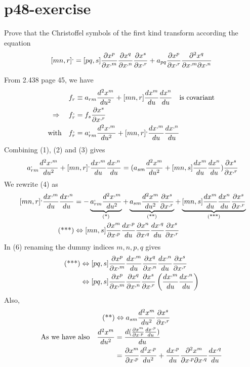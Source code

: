\section{p48-exercise }
\begin{tcolorbox}
Prove that the Christoffel symbols of the first kind transform according the equation 
$$[mn,r]^, =  [pq,s]\pdv{x^p}{x^{,m}} \pdv{x^q}{x^{,n}}\pdv{x^s}{x^{,r}}+ a_{pq}\pdv{x^p}{x^{,r}}\pdv{x^q}{x^{,m}}{x^{,n}}$$
\end{tcolorbox}
From 2.438 page 45, we have
\begin{align}
\ f_r &\equiv a_{rm}\dv[2]{x^m}{u} +[mn,r]\dv{x^m}{u}\dv{x^n}{u} \quad\text{is covariant} \\
\Rightarrow\quad f_r^, &= f_s\pdv{x^s}{x^{,r}}\\
\text{with}\quad f_r^, &= a^,_{rm}\dv[2]{x^{,m}}{u} +[mn,r]^, \dv{x^{,m}}{u}\dv{x^{,n}}{u}
\end{align}
Combining (1), (2) and (3) gives 
\begin{align}
\ a^,_{rm}\dv[2]{x^{,m}}{u} +[mn,r]^, \dv{x^{,m}}{u}\dv{x^{,n}}{u} = ( a_{sm}\dv[2]{x^m}{u} +[mn,s]\dv{x^m}{u}\dv{x^n}{u})\pdv{x^s}{x^{,r}}
\end{align}
We rewrite (4) as 
\begin{align}
\ [mn,r]^, \dv{x^{,m}}{u}\dv{x^{,n}}{u} &= -\underbrace{a^,_{rm}\dv[2]{x^{,m}}{u}}_\text{(*)} +\underbrace{ a_{sm}\dv[2]{x^m}{u}\pdv{x^s}{x^{,r}}}_\text{(**)} +\underbrace{[mn,s]\dv{x^m}{u}\dv{x^n}{u}\pdv{x^s}{x^{,r}}}_\text{(***)}\\
\text{(***)} &\Leftrightarrow [mn,s]\pdv{x^m}{x^{,p}}\dv{x^{,p}}{u}\pdv{x^n}{x^{,q}}\dv{x^{,q}}{u}\pdv{x^s}{x^{,r}}
\end{align}
In (6) renaming the dummy indices $m,n,p,q$ gives
\begin{align}
\text{(***)} &\Leftrightarrow [pq,s]\pdv{x^p}{x^{,m}}\dv{x^{,m}}{u}\pdv{x^q}{x^{,n}}\dv{x^{,n}}{u}\pdv{x^s}{x^{,r}}\\
&\Leftrightarrow [pq,s]\pdv{x^p}{x^{,m}}\pdv{x^q}{x^{,n}}\pdv{x^s}{x^{,r}}\left(\dv{x^{,m}}{u}\dv{x^{,n}}{u}\right)
\end{align}
Also,
\begin{align}
\text{(**)} &\Leftrightarrow  a_{sm}\dv[2]{x^m}{u}\pdv{x^s}{x^{,r}}\\
\text{As we have also}\quad \dv[2]{x^m}{u} &= \dv{(\pdv{x^m}{x^{,p}}\dv{x^{,p}}{u})}{u}\\
&= \pdv{x^m}{x^{,p}}\dv[2]{x^{,p}}{u}+\dv{x^{,p}}{u}\pdv{x^m}{x^{,p}}{x^{,q}}\dv{x^{,q}}{u} 
\end{align}
